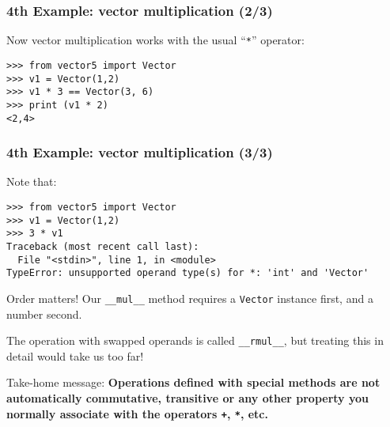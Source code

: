 \documentclass[english,serif,mathserif,xcolor=pdftex,dvipsnames,table]{beamer}
\begin{document}
\begin{frame}[fragile]
  \frametitle{4th Example: vector multiplication (2/3)}
  Now vector multiplication works with the usual ``\texttt{*}'' operator:
\begin{lstlisting}
>>> from vector5 import Vector
>>> v1 = Vector(1,2)
>>> v1 * 3 == Vector(3, 6)
>>> print (v1 * 2)
<2,4>
\end{lstlisting}
\end{frame}


\begin{frame}[fragile]
  \frametitle{4th Example: vector multiplication (3/3)}
  \small

  Note that:
\begin{lstlisting}
>>> from vector5 import Vector
>>> v1 = Vector(1,2)
>>> 3 * v1
Traceback (most recent call last):
  File "<stdin>", line 1, in <module>
TypeError: unsupported operand type(s) for *: 'int' and 'Vector'
\end{lstlisting}

  \+ Order matters! Our \lstinline|__mul__| method requires a \lstinline|Vector| instance first, and a number second.

  \+ The operation with swapped operands is called \lstinline|__rmul__|, but treating this in detail would take us too far!

  \+ Take-home message: \textbf{Operations defined with special
    methods are not automatically commutative, transitive or any other
    property you normally associate with the operators \texttt{+},
    \texttt{*}, etc.}
\end{frame}
\end{document}
